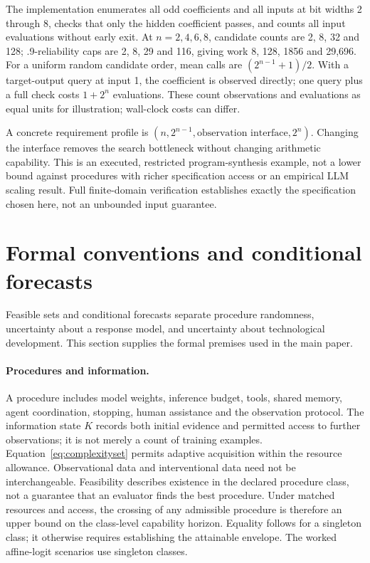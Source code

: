 The implementation enumerates all odd coefficients and all inputs at bit widths 2 through 8, checks that only the hidden coefficient passes, and counts all input evaluations without early exit. At $n=2,4,6,8$, candidate counts are 2, 8, 32 and 128; .9-reliability caps are 2, 8, 29 and 116, giving work 8, 128, 1856 and 29,696. For a uniform random candidate order, mean calls are $(2^{n-1}+1)/2$. With a target-output query at input 1, the coefficient is observed directly; one query plus a full check costs $1+2^n$ evaluations. These count observations and evaluations as equal units for illustration; wall-clock costs can differ.

A concrete requirement profile is $(n,2^{n-1},\text{observation interface},2^n)$. Changing the interface removes the search bottleneck without changing arithmetic capability. This is an executed, restricted program-synthesis example, not a lower bound against procedures with richer specification access or an empirical LLM scaling result. Full finite-domain verification establishes exactly the specification chosen here, not an unbounded input guarantee.

\section{Formal conventions and conditional forecasts}
\label{app:formal}
Feasible sets and conditional forecasts separate procedure randomness, uncertainty about a response model, and uncertainty about technological development. This section supplies the formal premises used in the main paper.

\paragraph{Procedures and information.}
A procedure includes model weights, inference budget, tools, shared memory, agent coordination, stopping, human assistance and the observation protocol. The information state $K$ records both initial evidence and permitted access to further observations; it is not merely a count of training examples. Equation~\ref{eq:complexityset} permits adaptive acquisition within the resource allowance. Observational data and interventional data need not be interchangeable. Feasibility describes existence in the declared procedure class, not a guarantee that an evaluator finds the best procedure. Under matched resources and access, the crossing of any admissible procedure is therefore an upper bound on the class-level capability horizon. Equality follows for a singleton class; it otherwise requires establishing the attainable envelope. The worked affine-logit scenarios use singleton classes.

